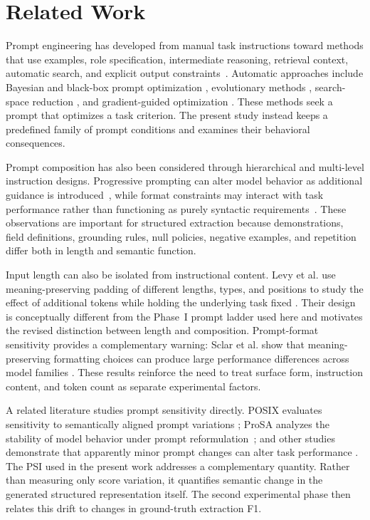 \documentclass[fleqn,10pt]{wlscirep-authoryear}
\begin{document}
\section{Related Work}
\label{sec:related}

Prompt engineering has developed from manual task instructions toward methods that
use examples, role specification, intermediate reasoning, retrieval context,
automatic search, and explicit output constraints~\cite{schulhoff2024prompt}.
Automatic approaches include Bayesian and black-box prompt optimization
\cite{Sabbatella2025348}, evolutionary methods
\cite{Wang202563036,Chouayfati20251171}, search-space reduction
\cite{Zhou202313064}, and gradient-guided optimization
\cite{Zhong2025716,Zhang2025}. These methods seek a prompt that optimizes a task
criterion. The present study instead keeps a predefined family of prompt
conditions and examines their behavioral consequences.

Prompt composition has also been considered through hierarchical and multi-level
instruction designs. Progressive prompting can alter model behavior as additional
guidance is introduced~\cite{son2025multilevelPrompting}, while format constraints
may interact with task performance rather than functioning as purely syntactic
requirements~\cite{tam2024formatRestrictions}. These observations are important
for structured extraction because demonstrations, field definitions, grounding
rules, null policies, negative examples, and repetition differ both in length and
semantic function.

Input length can also be isolated from instructional content. Levy et al. use
meaning-preserving padding of different lengths, types, and positions to study the
effect of additional tokens while holding the underlying task fixed
\cite{levy2024same}. Their design is conceptually different from the Phase~I
prompt ladder used here and motivates the revised distinction between length and
composition. Prompt-format sensitivity provides a complementary warning: Sclar
et al. show that meaning-preserving formatting choices can produce large
performance differences across model families \cite{sclar2024spurious}. These
results reinforce the need to treat surface form, instruction content, and token
count as separate experimental factors.


A related literature studies prompt sensitivity directly. POSIX evaluates
sensitivity to semantically aligned prompt variations
\cite{chatterjee2024posix}; ProSA analyzes the stability of model behavior under
prompt reformulation~\cite{zhuo2024prosa}; and other studies demonstrate that
apparently minor prompt changes can alter task performance
\cite{lu2024promptSensitivity}. The PSI used in the present work addresses a
complementary quantity. Rather than measuring only score variation, it quantifies
semantic change in the generated structured representation itself. The second
experimental phase then relates this drift to changes in ground-truth extraction
F1.
\end{document}
